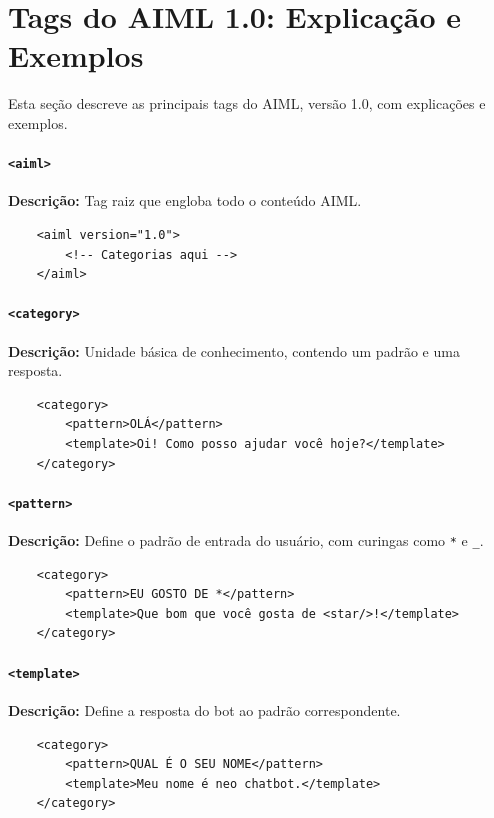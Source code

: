 \documentclass[14pt,a4paper,oneside]{book}
\begin{document}
\section{Tags do AIML 1.0: Explicação e Exemplos}

Esta seção descreve as principais tags do AIML, versão 1.0, com explicações e exemplos.

\paragraph{\texttt{<aiml>}} 

\textbf{Descrição:} Tag raiz que engloba todo o conteúdo AIML. 

\begin{verbatim}
	<aiml version="1.0">
		<!-- Categorias aqui -->
	</aiml>
\end{verbatim}

\paragraph{\texttt{<category>}} 

\textbf{Descrição:} Unidade básica de conhecimento, contendo um padrão e uma resposta. 

\begin{verbatim}
	<category>
		<pattern>OLÁ</pattern>
		<template>Oi! Como posso ajudar você hoje?</template>
	</category>
\end{verbatim}

\paragraph{\texttt{<pattern>}} 

\textbf{Descrição:} Define o padrão de entrada do usuário, com curingas como \texttt{*} e \texttt{\_}. 

\begin{verbatim}
	<category>
		<pattern>EU GOSTO DE *</pattern>
		<template>Que bom que você gosta de <star/>!</template>
	</category>
\end{verbatim}

\paragraph{\texttt{<template>}} 

\textbf{Descrição:} Define a resposta do bot ao padrão correspondente. 

\begin{verbatim}
	<category>
		<pattern>QUAL É O SEU NOME</pattern>
		<template>Meu nome é neo chatbot.</template>
	</category> 
\end{verbatim}
\end{document}
